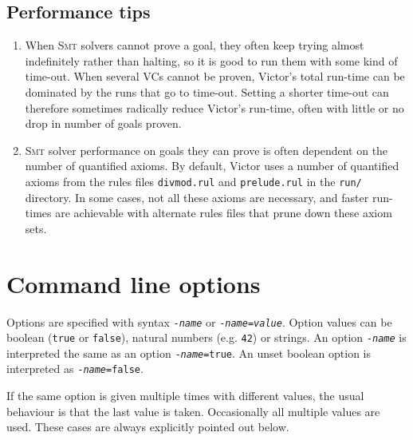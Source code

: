 \documentclass[12pt,fleqn]{article}
\newcommand{\smt}{\textsc{Smt}}
\begin{document}
\subsection{Performance tips}

\begin{enumerate}

\item When \smt{} solvers cannot prove a goal, they often keep trying
  almost indefinitely rather than halting, so it is good to run them
  with some kind of time-out.  
  When several VCs cannot be proven, Victor's total run-time can be
  dominated by the runs that go to time-out.  Setting a shorter
  time-out can therefore sometimes radically reduce Victor's run-time,
  often with little or no drop in number of goals proven.

\item \smt{} solver performance on goals they can prove is often
  dependent on the number of quantified axioms. 
  By default, Victor uses a number of quantified axioms from the 
  rules files \texttt{divmod.rul} and \texttt{prelude.rul} in the \texttt{run/}
  directory. 
  In some cases, not all these axioms are necessary, and faster
  run-times are achievable with alternate rules files that prune down
  these axiom sets.

\end{enumerate}


\section{Command line options}
Options are specified with syntax 
\texttt{-\emph{name}} or
\texttt{-\emph{name}=\emph{value}}.
%
Option values can be boolean (\texttt{true} or \texttt{false}),
natural numbers (e.g. \texttt{42}) or strings.
%
An option \texttt{-\emph{name}} is interpreted the same as 
an option \texttt{-\emph{name}=true}.  An unset boolean option is interpreted
as \texttt{-\emph{name}=false}.

If the same option is given multiple times with different values, the
usual behaviour is that the last value is taken.  Occasionally all multiple 
values are used.  These cases are always explicitly pointed out below.
\end{document}
